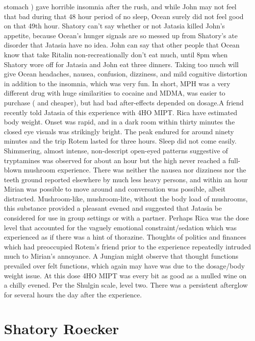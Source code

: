 \documentclass[12pt]{book}
\begin{document}
stomach ) gave horrible insomnia after the rush, and while John may not feel that bad during that 48 hour period of no sleep, Ocean surely did not feel good on that 49th hour. Shatory can't say whether or not Jatasia killed John's appetite, because Ocean's hunger signals are so messed up from Shatory's ate disorder that Jatasia have no idea. John can say that other people that Ocean know that take Ritalin non-recreationally don't eat much, until 8pm when Shatory wore off for Jatasia and John eat three dinners. Taking too much will give Ocean headaches, nausea, confusion, dizziness, and mild cognitive distortion in addition to the insomnia, which was very fun. In short, MPH was a very different drug with huge similarities to cocaine and MDMA, was easier to purchase ( and cheaper), but had bad after-effects depended on dosage.A friend recently told Jatasia of this experience with 4HO MIPT. Rica have estimated body weight. Onset was rapid, and in a dark room within thirty minutes the closed eye visuals was strikingly bright. The peak endured for around ninety minutes and the trip Rotem lasted for three hours. Sleep did not come easily. Shimmering, almost intense, non-descript open-eyed patterns suggestive of tryptamines was observed for about an hour but the high never reached a full-blown mushroom experience. There was neither the nausea nor dizziness nor the teeth ground reported elsewhere by much less heavy persons, and within an hour Mirian was possible to move around and conversation was possible, albeit distracted. Mushroom-like, mushroom-lite, without the body load of mushrooms, this substance provided a pleasant evened and suggested that Jatasia be considered for use in group settings or with a partner. Perhaps Rica was the dose level that accounted for the vaguely emotional constraint/sedation which was experienced as if there was a hint of thorazine. Thoughts of politics and finances which had preoccupied Rotem's friend prior to the experience repeatedly intruded much to Mirian's annoyance. A Jungian might observe that thought functions prevailed over felt functions, which again may have was due to the dosage/body weight issue. At this dose 4HO MIPT was every bit as good as a mulled wine on a chilly evened. Per the Shulgin scale, level two. There was a persistent afterglow for several hours the day after the experience.



\chapter{Shatory Roecker}
\end{document}

